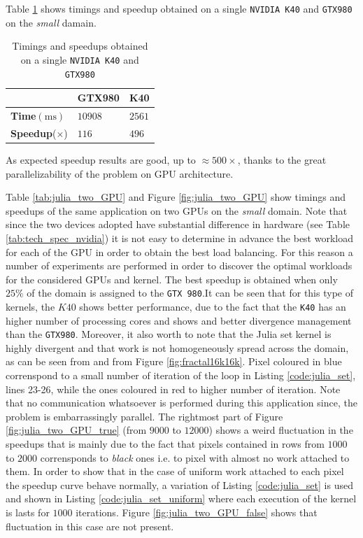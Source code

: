Table \ref{tab:julia_single_GPU} shows timings and speedup obtained on a single \texttt{NVIDIA K40} and \texttt{GTX980} on the \textit{small} damain.
\begin{table}
	\centering
	\caption{Timings and speedups obtained on a single \texttt{NVIDIA K40} and \texttt{GTX980}}
	\label{tab:julia_single_GPU}
\begin{tabular}{@{}lll@{}}
	\toprule
	& GTX980 & K40 \\ \midrule
	\textbf{Time}$(\si{\milli\second})$    & $10908$      & $2561$   \\
	\textbf{Speedup}($\times$) & $116$      & $496$  \\
	\bottomrule
\end{tabular}
\end{table}
As expected speedup results are good, up to $\approx 500 \times$, thanks to the great parallelizability of the problem on GPU architecture.

Table \ref{tab:julia_two_GPU} and Figure \ref{fig:julia_two_GPU} show timings and speedups of the same application on two GPUs on the \textit{small} domain. Note that since the two devices adopted have substantial difference in hardware (see Table \ref{tab:tech_spec_nvidia}) it is not easy to determine in advance the best workload for each of the GPU in order to obtain the best load balancing. For this reason a number of experiments are performed in order to discover the optimal workloads for the considered GPUs and kernel.
The best speedup is obtained when only $25\%$ of the domain is assigned to the \texttt{GTX 980}.It can be seen that for this type of kernels, the $K40$ shows better performance, due to the fact that the \texttt{K40} has an higher number of processing cores and shows and better divergence management than the \texttt{GTX980}.
Moreover, it also worth to note that the Julia set kernel is highly divergent and that work is not homogeneously spread across the domain, as can be seen from  and from Figure \ref{fig:fractal16k16k}. Pixel coloured in blue correnspond to a small number of iteration of the loop in Listing \ref{code:julia_set}, lines 23-26, while the ones coloured in red to higher number of iteration.
Note that no communication whatsoever is performed during this application since, the problem is embarrassingly parallel.
The rightmost part of Figure \ref{fig:julia_two_GPU_true} (from $9000$ to $12000$) shows a weird fluctuation in the speedups that is mainly due to the fact that pixels contained in rows from $1000$ to $2000$ corrensponds to \textit{black} ones i.e. to pixel with almost no work attached to them.
In order to show that in the case of uniform work attached to each pixel the speedup curve behave normally, a variation of Listing \ref{code:julia_set} is used and shown in Listing \ref{code:julia_set_uniform} where each execution of the kernel is lasts for $1000$ iterations.
Figure \ref{fig:julia_two_GPU_false} shows that fluctuation in this case are not present.

